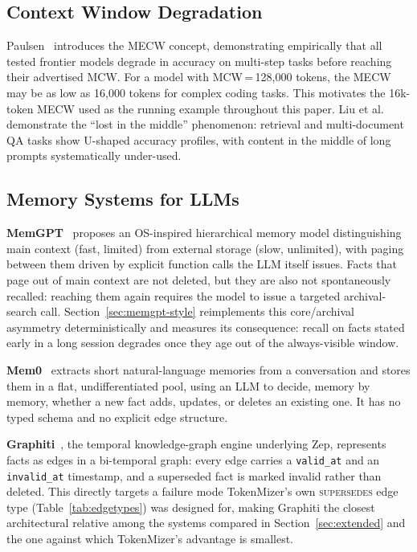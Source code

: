 \documentclass[journal]{IEEEtran}
\begin{document}
\subsection{Context Window Degradation}

Paulsen~\cite{paulsen2025} introduces the MECW concept,
demonstrating empirically that all tested frontier models
degrade in accuracy on multi-step tasks before reaching
their advertised MCW.
For a model with MCW\,=\,128{,}000 tokens, the MECW may be
as low as 16{,}000 tokens for complex coding tasks.
This motivates the 16k-token MECW used as the running example
throughout this paper.
Liu et al.~\cite{lostmiddle} demonstrate the ``lost in the
middle'' phenomenon: retrieval and multi-document QA tasks
show U-shaped accuracy profiles, with content in the middle
of long prompts systematically under-used.

\subsection{Memory Systems for LLMs}
\label{sec:related-memory}

\textbf{MemGPT}~\cite{memgpt} proposes an OS-inspired
hierarchical memory model distinguishing main context (fast,
limited) from external storage (slow, unlimited), with
paging between them driven by explicit function calls the
LLM itself issues.
Facts that page out of main context are not deleted, but they
are also not spontaneously recalled: reaching them again
requires the model to issue a targeted archival-search call.
Section~\ref{sec:memgpt-style} reimplements this core/archival
asymmetry deterministically and measures its consequence:
recall on facts stated early in a long session degrades once
they age out of the always-visible window.

\textbf{Mem0}~\cite{mem0} extracts short natural-language
memories from a conversation and stores them in a flat,
undifferentiated pool, using an LLM to decide, memory by
memory, whether a new fact adds, updates, or deletes an
existing one.
It has no typed schema and no explicit edge structure.

\textbf{Graphiti}~\cite{zep}, the temporal knowledge-graph
engine underlying Zep, represents facts as edges in a
bi-temporal graph: every edge carries a \texttt{valid\_at} and
an \texttt{invalid\_at} timestamp, and a superseded fact is
marked invalid rather than deleted.
This directly targets a failure mode TokenMizer's own
\textsc{supersedes} edge type (Table~\ref{tab:edgetypes}) was
designed for, making Graphiti the closest architectural
relative among the systems compared in
Section~\ref{sec:extended} and the one against which
TokenMizer's advantage is smallest.
\end{document}
